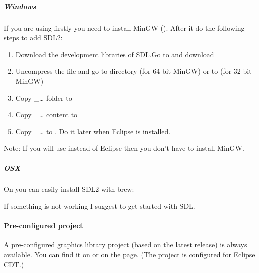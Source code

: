 \documentclass[letterpaper,10pt,english]{sphinxmanual}
\begin{document}
\subparagraph{Windows}
\label{\detokenize{get-started/pc-simulator:windows}}
If you are using  firstly you need to install MinGW (). After it do the following steps to add SDL2:
\begin{enumerate}
\item {} 
Download the development libraries of SDL.Go to  and download 

\item {} 
Uncompress the file and go to  directory (for 64 bit MinGW) or to  (for 32 bit MinGW)

\item {} 
Copy \_… folder to 

\item {} 
Copy \_… content to 

\item {} 
Copy \_… to .  Do it later when Eclipse is installed.

\end{enumerate}

Note: If you will use  instead of Eclipse then you don’t have to install MinGW.


\subparagraph{OSX}
\label{\detokenize{get-started/pc-simulator:osx}}
On  you can easily install SDL2 with brew: 

If something is not working I suggest  to get started with SDL.


\paragraph{Pre-configured project}
\label{\detokenize{get-started/pc-simulator:pre-configured-project}}
A pre-configured graphics library project (based on the latest release) is always available.
You can find it on  or on the  page.
(The project is configured for Eclipse CDT.)
\end{document}
